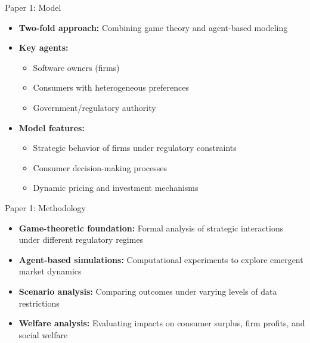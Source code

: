 \documentclass[10pt,aspectratio=169]{beamer}
\begin{document}
\begin{frame}{Paper 1: Model}
\begin{itemize}
    \item \textbf{Two-fold approach:} Combining game theory and agent-based modeling
    
    \vspace{2mm}
    \item \textbf{Key agents:}
    \begin{itemize}
        \item[-] Software owners (firms)
        \item[-] Consumers with heterogeneous preferences
        \item[-] Government/regulatory authority
    \end{itemize}
    
    \vspace{2mm}
    \item \textbf{Model features:}
    \begin{itemize}
        \item[-] Strategic behavior of firms under regulatory constraints
        \item[-] Consumer decision-making processes
        \item[-] Dynamic pricing and investment mechanisms 
    \end{itemize}
\end{itemize}
\end{frame}

\begin{frame}{Paper 1: Methodology}
\begin{itemize}
    \item \textbf{Game-theoretic foundation:} Formal analysis of strategic interactions under different regulatory regimes
    
    \vspace{2mm}
    \item \textbf{Agent-based simulations:} Computational experiments to explore emergent market dynamics
    
    \vspace{2mm}
    \item \textbf{Scenario analysis:} Comparing outcomes under varying levels of data restrictions
    
    \vspace{2mm}
    \item \textbf{Welfare analysis:} Evaluating impacts on consumer surplus, firm profits, and social welfare
\end{itemize}
\end{frame}
\end{document}
